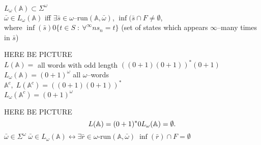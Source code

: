 {
    $L_{\omega}(\mathbb{A}) \subset \Sigma^{\omega}$ \\
    $\bar{\omega} \in L_{\omega}(\mathbb{A})$ iff $\exists \bar{s} \in \omega\text{--run}(\mathbb{A},\bar{\omega}) $, $\inf(\bar{s}\cap F \neq \emptyset$,\\
    where $\inf(\bar{s}) 0 \{ t \in S\; : \: \forall^{\infty} n s_n = t \} $ 
    (set of states which appears $\infty$--many times in  $\bar{s}$)
}
\ex{}
{
    HERE BE PICTURE\\
    $L(\mathbb{A}) = $ all words with odd length $((0+1)(0+1))^{*}(0+1)$\\
    $L_{\omega}(\mathbb{A}) = (0+1)^{\omega} $ all $\omega$--words\\
    $\mathbb{A}^{c}, \; L(\mathbb{A}^{c}) = ((0+1)(0+1))^{*}$ \\
    $L_{\omega}(\mathbb{A}^{c}) = (0+1)^{\omega}$

}

{
    HERE BE PICTURE
    \[
    L(\mathbb{A}) = (0+1)^{*}0\\
    L_{\omega}(\mathbb{A}) = \emptyset
    .\] 
    $\bar{\omega} \in \Sigma^{\omega} \; \bar{\omega} \in L_{\omega}(\mathbb{A}) \leftrightarrow \exists \bar{r}\in \omega\text{-run}(\mathbb{A},\bar{\omega})\; \inf(\bar{r})\cap F = \emptyset $
}

